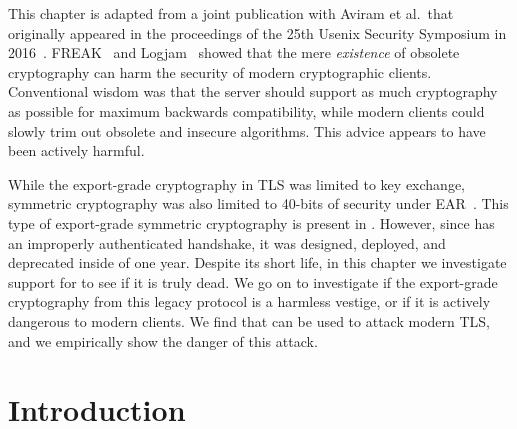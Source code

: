 \newcommand{\DrownPaper}{papers/drown/paper}
\newcommand{\DrownFigures}{papers/drown/figures}



\newif\ifext\extfalse
\newif\ifdraft\draftfalse
\newif\ifblind\blindtrue
\newif\ifsubmit\submitfalse

\draftfalse
\blindfalse




This chapter is adapted from a joint publication with Aviram et al.\ that
originally appeared in the proceedings of the 25th Usenix Security Symposium
in 2016~\cite{drown-2016}. FREAK~\cite{freak-attack-2015} and
Logjam~\cite{logjam-2015} showed that the mere \textit{existence} of obsolete
cryptography can harm the security of modern cryptographic clients.
Conventional wisdom was that the server should support as much cryptography
as possible for maximum backwards compatibility, while modern clients could
slowly trim out obsolete and insecure algorithms. This advice appears to have
been actively harmful.

While the export-grade cryptography in TLS was limited to key exchange,
symmetric cryptography was also limited to 40-bits of security under
EAR~\cite{ear-2001-cat-5}. This type of export-grade symmetric cryptography
is present in \ssltwo. However, since \ssltwo has an improperly authenticated
handshake, it was designed, deployed, and deprecated inside of one year.
Despite its short life, in this chapter we investigate support for \ssltwo to
see if it is truly dead. We go on to investigate if the export-grade
cryptography from this legacy protocol is a harmless vestige, or if it is
actively dangerous to modern clients. We find that \ssltwo can be used to
attack modern TLS, and we empirically show the danger of this attack.



\section{Introduction}



